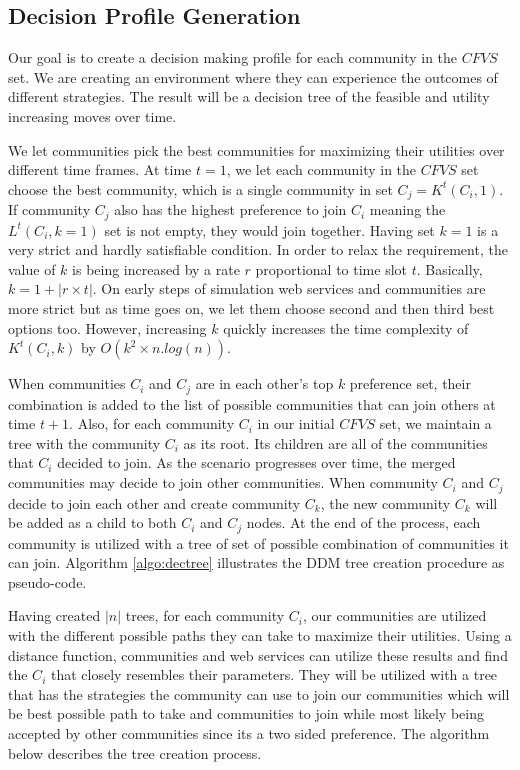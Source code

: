 \documentclass[10pt,journal,cspaper,compsoc]{IEEEtran}
\begin{document}
\subsection{Decision Profile Generation}\label{ss:learningmodel}

Our goal is to create a decision making profile for each community in the $CFVS$ set. We are creating an environment where they can experience the outcomes of different strategies. The result will be a decision tree of the feasible and utility increasing moves over time.

We let communities pick the best communities for maximizing their utilities over different time frames. At time $t = 1$, we let each community in the $CFVS$ set choose the best community, which is a single community in set $C_j = K^t(C_i, 1)$. If community $C_j$ also has the highest preference to join $C_i$ meaning the $L^t(C_i, k=1)$ set is not empty, they would join together. Having set $k = 1$ is a very strict and hardly satisfiable condition. In order to relax the requirement, the value of $k$ is being increased by a rate $r$ proportional to time slot $t$. Basically, $k = 1 + |r \times t|$. On early steps of simulation web services and communities are more strict but as time goes on, we let them choose second and then third best options too. However, increasing $k$ quickly increases the time complexity of $K^t(C_i, k)$ by $O(k^2 \times n.log(n))$. 

When communities $C_i$ and $C_j$ are in each other's top $k$ preference set, their combination is added to the list of possible communities that can join others at time $t+1$. Also, for each community $C_i$ in our initial $CFVS$ set, we maintain a tree with the community $C_i$ as its root. Its children are all of the communities that $C_i$ decided to join. As the scenario progresses over time, the merged communities may decide to join other communities. When community $C_i$ and $C_j$ decide to join each other and create community $C_k$, the new community $C_k$ will be added as a child to both $C_i$ and $C_j$ nodes. At the end of the process, each community is utilized with a tree of set of possible combination of communities it can join. Algorithm \ref{algo:dectree} illustrates the DDM tree creation procedure as pseudo-code.

Having created $|n|$ trees, for each community $C_i$, our communities are utilized with the different possible paths they can take to maximize their utilities. Using a distance function, communities and web services can utilize these results and find the $C_i$ that closely resembles their parameters. They will be utilized with a tree that has the strategies the community can use to join our communities which will be best possible path to take and communities to join while most likely being accepted by other communities since its a two sided preference. The algorithm below describes the tree creation process.
\end{document}
